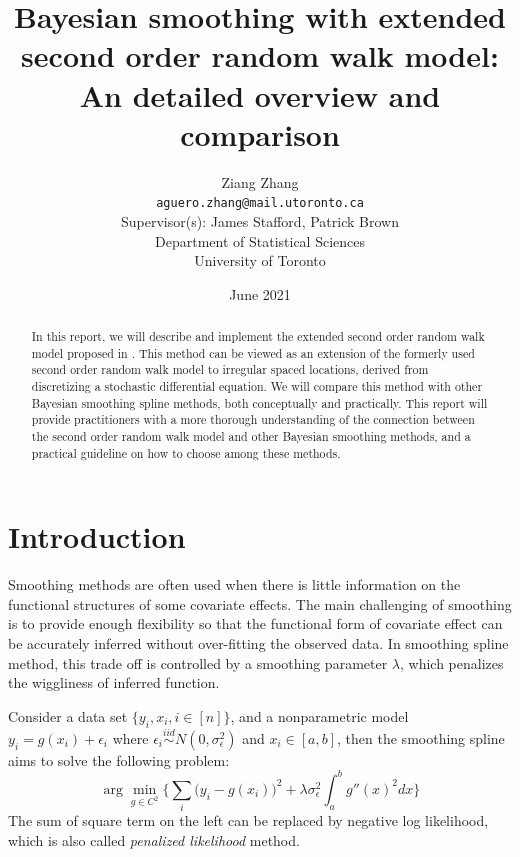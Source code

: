 \documentclass{article}
\title{\textbf{Bayesian smoothing with extended second order random walk model: An detailed overview and comparison}}
\author{
Ziang Zhang \\ \vspace{-0.3cm}\normalsize\texttt{aguero.zhang@mail.utoronto.ca}\\ 
\large
\vspace{0.5cm}
Supervisor(s): James Stafford, Patrick Brown \\ 

\vspace{0.5cm}
Department of Statistical Sciences \\
University of Toronto
}
\date{June 2021}
\begin{document}
\maketitle


\newpage

\begin{abstract}
In this report, we will describe and implement the extended second order random walk model proposed in \cite{rw2}. This method can be viewed as an extension of the formerly used second order random walk model to irregular spaced locations, derived from discretizing a stochastic differential equation. We will compare this method with other Bayesian smoothing spline methods, both conceptually and practically. This report will provide practitioners with a more thorough understanding of the connection between the second order random walk model and other Bayesian smoothing methods, and a practical guideline on how to choose among these methods.
\end{abstract}


\bigskip

\tableofcontents

\newpage


\section{Introduction}\label{intro}

Smoothing methods are often used when there is little information on the functional structures of some covariate effects. The main challenging of smoothing is to provide enough flexibility so that the functional form of covariate effect can be accurately inferred without over-fitting the observed data. In smoothing spline method, this trade off is controlled by a smoothing parameter $\lambda$, which penalizes the wiggliness of inferred function. 

Consider a data set $\{y_i,x_i, i\in [n]\}$, and a nonparametric model $y_i = g(x_i) + \epsilon_i$ where $\epsilon_i \overset{iid}\sim N(0,\sigma_\epsilon^2)$ and $x_i \in [a,b]$, then the smoothing spline aims to solve the following problem:
\begin{equation}\label{equ:ss}
\arg\min_{g\in C^2} \bigg\{ \sum_i\bigg(y_i-g(x_i)\bigg)^2 + \lambda \sigma_\epsilon^2 \int_a^b g''(x)^2 dx \bigg\}
\end{equation}
The sum of square term on the left can be replaced by negative log likelihood, which is also called \textit{penalized likelihood} method.
\end{document}
